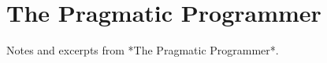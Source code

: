 \documentclass{article}
\begin{document}
\section*{The Pragmatic Programmer}
Notes and excerpts from *The Pragmatic Programmer*.
\end{document}
